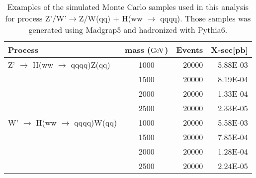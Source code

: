\begin{table}[htb]
\begin{center}
\begin{tabular}{ |l|c|r|r| }
\hline
Process     & mass ($\mathrm{GeV}$) & Events & X-sec[pb] \\
\hline
Z' $\to$ H(ww $\to$ qqqq)Z(qq) & 1000   &20000   & 5.88E-03 \\
 & 1500   &20000   & 8.19E-04 \\
 & 2000   &20000   & 1.33E-04 \\
 & 2500  &20000   & 2.33E-05 \\\hline
W' $\to$ H(ww $\to$ qqqq)W(qq)& 1000   &20000   & 5.58E-03 \\
 & 1500 &20000   & 7.85E-04  \\
 & 2000 &20000   & 1.28E-04 \\
 & 2500  &20000   & 2.24E-05 \\
\hline
\end{tabular}
\end{center}
\caption{Examples of the simulated Monte Carlo samples used in this analysis for process
 Z'/W'$\to$Z/W(qq) + H(ww $\to$ qqqq). Those samples was generated using Madgrap5 and hadronized with Pythia6.}
\label{table:Hww}
\end{table}

\fi


